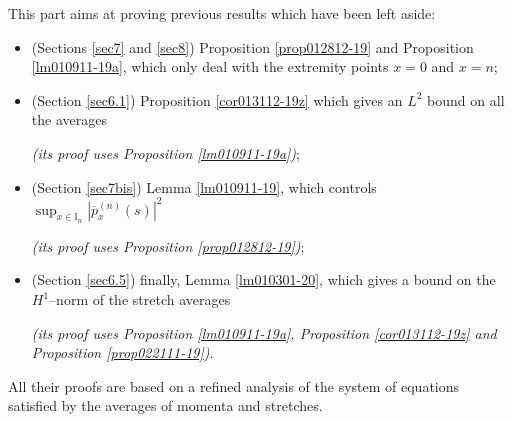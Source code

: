 \documentclass[EJP]{ejpecp} %
\newcommand\T{{\mathbb I}}
\renewcommand{\bar}{\overline}
\numberwithin{equation}{section}
\begin{document}
\label{sec66}

This part aims at proving previous results which have been left aside: \begin{itemize}
\item (Sections \ref{sec7} and \ref{sec8}) Proposition \ref{prop012812-19} and
 Proposition \ref{lm010911-19a}, which only deal with the extremity points $x=0$ and $x=n$;
 
 \item (Section \ref{sec6.1})  Proposition \ref{cor013112-19z} which gives an $L^2$ bound on all the averages 
 
 \emph{(its proof uses Proposition \ref{lm010911-19a})};
 
 \item (Section \ref{sec7bis}) Lemma \ref{lm010911-19}, which controls $\sup_{x\in\T_n} |\bar p_x^{(n)}(s)|^2$ 
 
 \emph{(its proof uses Proposition \ref{prop012812-19})}; 
\item (Section \ref{sec6.5}) finally, Lemma \ref{lm010301-20}, which gives a bound on the $H^1$--norm of the stretch averages 

\emph{(its proof uses Proposition \ref{lm010911-19a}, Proposition \ref{cor013112-19z} and Proposition \ref{prop022111-19})}.

\end{itemize}
All their proofs are based on a refined analysis of the system of equations satisfied by the averages of momenta and stretches.

\bigskip
\end{document}
